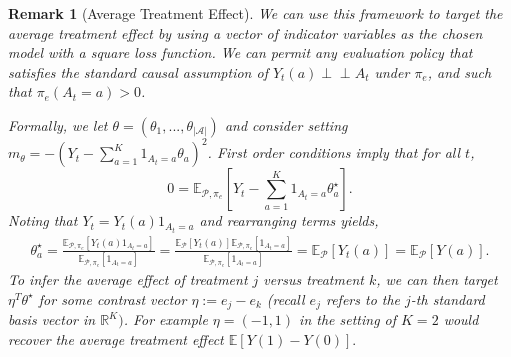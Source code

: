 \documentclass[11pt]{article}
\newcommand{\R}{\mathbb{R}}
\newtheorem{remark}{Remark}
\begin{document}
\begin{remark}[Average Treatment Effect]
We can use this framework to target the average treatment effect by using a vector of indicator variables as the chosen model with a square loss function. We can permit any evaluation policy that satisfies the standard causal assumption of $Y_{t}(a) \perp \!\!\! \perp A_{t}$ under $\pi_{e}$, and such that $\pi_{e}(A_{t}=a) > 0$. 

Formally, we let $\theta = (\theta_1, ..., \theta_{|\mathcal{A}|})$ and consider setting  $m_{\theta} = -(Y_{t} - \sum_{a=1}^{K} 1_{A_{t} = a} \theta_{a})^{2}$. First order conditions imply that for all $t$,
$$0= \mathbb{E}_{\mathcal{P}, \pi_{e}}\left[ Y_{t} - \sum_{a=1}^{K} 1_{A_{t} = a} \theta^{\star}_{a}\right].$$
Noting that $Y_{t} = Y_{t}(a) 1_{A_{t} = a}$ and rearranging terms yields, 
\begin{align*}
 \theta^{\star}_{a} = \frac{\mathbb{E}_{\mathcal{P}, \pi_{e}}\left[Y_{t}(a) 1_{A_{t} = a} \right]  }{ \mathbb{E}_{\mathcal{P}, \pi_{e}}\left[ 1_{A_{t} = a} \right]  } =  \frac{ 
  \mathbb{E}_{\mathcal{P}}\left[Y_{t}(a)\right] \mathbb{E}_{\mathcal{P}, \pi_{e}}\left[ 1_{A_{t} = a} \right]  }{ \mathbb{E}_{\mathcal{P}, \pi_{e}}\left[ 1_{A_{t} = a} \right]  }  = \mathbb{E}_{\mathcal{P}}\left[Y_{t}(a)\right]= \mathbb{E}_{\mathcal{P}}\left[Y(a)\right].
\end{align*}
To infer the average effect of treatment $j$ versus treatment $k$, we can then target $\eta^{T} \theta^{\star}$ for some contrast vector $\eta:= e_{j} - e_{k}$ (recall $e_j$ refers to the $j$-th standard basis vector in $\R^{K})$. For example $\eta = (-1,1)$ in the setting of $K=2$ would recover the  average treatment effect $ \mathbb{E}\left[Y(1) - Y(0) \right].$
\end{remark}
\end{document}
